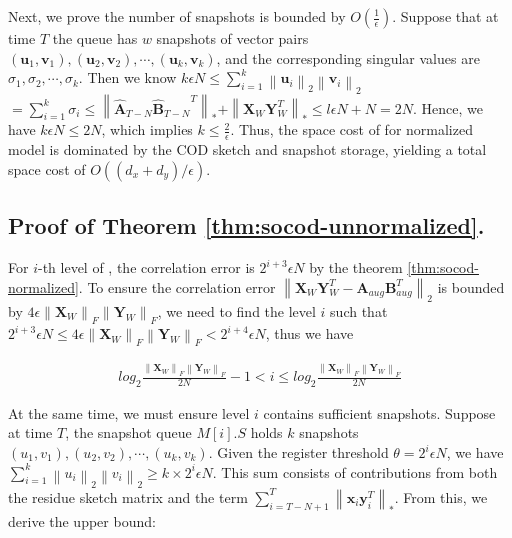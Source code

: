     Next, we prove the number of snapshots is bounded by $O(\frac{1}{\epsilon})$. Suppose that at time $T$ the queue has $w$ snapshots of vector pairs $(\boldsymbol{u}_1,\boldsymbol{v}_1),(\boldsymbol{u}_2,\boldsymbol{v}_2),\cdots,(\boldsymbol{u}_k,\boldsymbol{v}_k)$, and the corresponding singular values are $\sigma_1,\sigma_2,\cdots,\sigma_k$. Then we know $k\epsilon N\leq $$\sum_{i=1}^k\left\|\boldsymbol{u}_i\right\|_2\left\|\boldsymbol{v}_i\right\|_2$$=\sum_{i=1}^k\sigma_i\leq \left\|\hat{\boldsymbol{A}}_{T-N}{\hat{\boldsymbol{B}}_{T-N}}^T\right\|_{*}$$ + \left\|\boldsymbol{X}_W\boldsymbol{Y}_W^T\right\|_* \leq l\epsilon N + N = 2N$. Hence, we have $k\epsilon N \leq 2N$, which implies $k\leq \frac{2}{\epsilon}$. Thus, the space cost of \oursolution for normalized model is dominated by the COD sketch and snapshot storage, yielding a total space cost of $O((d_x+d_y)/\epsilon)$.

 \subsection{Proof of Theorem \ref{thm:socod-unnormalized}.}

    For $i$-th level of \newsolution, the correlation error is $2^{i+3}\epsilon N$ by the theorem \ref{thm:socod-normalized}. To ensure the correlation error $\left\| \boldsymbol{X}_W\boldsymbol{Y}_W^T - \boldsymbol{A}_{aug}\boldsymbol{B}_{aug}^T\right\|_2$ is bounded by $4\epsilon \left\| \boldsymbol{X}_W\right\|_F\left\| \boldsymbol{Y}_W\right\|_F$, we need to find the level $i$ such that $2^{i+3}\epsilon N \leq 4\epsilon \left\| \boldsymbol{X}_W\right\|_F\left\| \boldsymbol{Y}_W\right\|_F < 2^{i+4}\epsilon N $, thus we have

    \begin{align}
        log_2{\frac{\left\| \boldsymbol{X}_W\right\|_F\left\| \boldsymbol{Y}_W\right\|_F}{2N}} - 1 < i \leq  log_2{\frac{\left\| \boldsymbol{X}_W\right\|_F\left\| \boldsymbol{Y}_W\right\|_F}{2N}} \label{ine:level-i-range}
    \end{align}

    At the same time, we must ensure level $i$ contains sufficient snapshots. Suppose at time $T$, the snapshot queue $M[i].S$ holds $k$ snapshots $(u_1,v_1),(u_2,v_2),\cdots,(u_k,v_k)$. Given the register threshold $\theta = 2^i\epsilon N$, we have $\sum_{i=1}^k\left\|u_i \right\|_2\left\|v_i\right\|_2 \geq k\times2^i\epsilon N$. This sum consists of contributions from both the residue sketch matrix and the term $\sum_{i=T-N+1}^T \left\| \boldsymbol{x}_i \boldsymbol{y}_i^T\right\|_*$. From this, we derive the upper bound:
    
